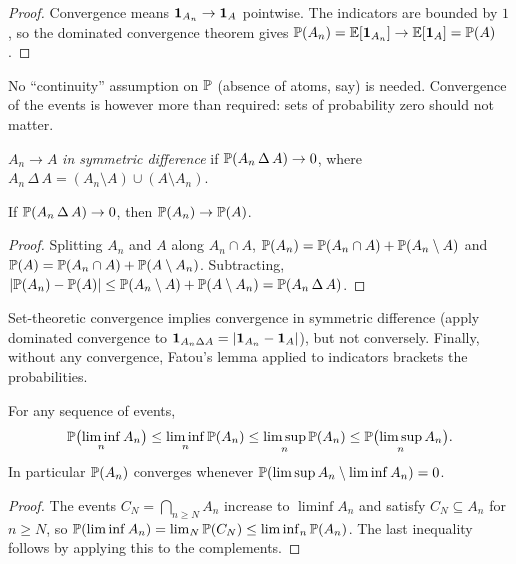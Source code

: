 \begin{notechapter}
\begin{proof}
Convergence means $\mathbf{1}_{A_n}\to\mathbf{1}_A$ pointwise. The indicators are bounded
by $1$, so the dominated convergence theorem gives
$\mathbb{P}(A_n) = \mathbb{E}[\mathbf{1}_{A_n}]\to\mathbb{E}[\mathbf{1}_A] = \mathbb{P}(A)$.
\end{proof}

No ``continuity'' assumption on $\mathbb{P}$ (absence of atoms, say) is needed.
Convergence of the events is however more than required: sets of probability
zero should not matter.

\begin{definition}
$A_n\to A$ \emph{in symmetric difference} if $\mathbb{P}(A_n\,\Delta\,A)\to0$, where
$A_n\,\Delta\,A = (A_n\setminus A)\cup(A\setminus A_n)$.
\end{definition}

\begin{proposition}\label{convergence-of-events:prop:symdiff}
If $\mathbb{P}(A_n\,\Delta\,A)\to0$, then $\mathbb{P}(A_n)\to\mathbb{P}(A)$.
\end{proposition}

\begin{proof}
Splitting $A_n$ and $A$ along $A_n\cap A$,
$\mathbb{P}(A_n) = \mathbb{P}(A_n\cap A) + \mathbb{P}(A_n\setminus A)$ and
$\mathbb{P}(A) = \mathbb{P}(A_n\cap A) + \mathbb{P}(A\setminus A_n)$. Subtracting,
$\left|\mathbb{P}(A_n) - \mathbb{P}(A)\right|\leq\mathbb{P}(A_n\setminus A) + \mathbb{P}(A\setminus A_n) = \mathbb{P}(A_n\,\Delta\,A)$.
\end{proof}

Set-theoretic convergence implies convergence in symmetric difference (apply
dominated convergence to $\mathbf{1}_{A_n\Delta A} = \left|\mathbf{1}_{A_n} - \mathbf{1}_A\right|$),
but not conversely. Finally, without any convergence, Fatou's lemma applied to
indicators brackets the probabilities.

\begin{proposition}\label{convergence-of-events:prop:fatou}
For any sequence of events,
\[
  \mathbb{P}\bigl(\liminf_nA_n\bigr)\leq\liminf_n\mathbb{P}(A_n)\leq\limsup_n\mathbb{P}(A_n)\leq\mathbb{P}\bigl(\limsup_nA_n\bigr).
\]
In particular $\mathbb{P}(A_n)$ converges whenever $\mathbb{P}(\limsup A_n\setminus\liminf A_n) = 0$.
\end{proposition}

\begin{proof}
The events $C_N = \bigcap_{n\geq N}A_n$ increase to $\liminf A_n$ and satisfy
$C_N\subseteq A_n$ for $n\geq N$, so
$\mathbb{P}(\liminf A_n) = \lim_N\mathbb{P}(C_N)\leq\liminf_n\mathbb{P}(A_n)$. The last inequality
follows by applying this to the complements.
\end{proof}


\end{notechapter}
